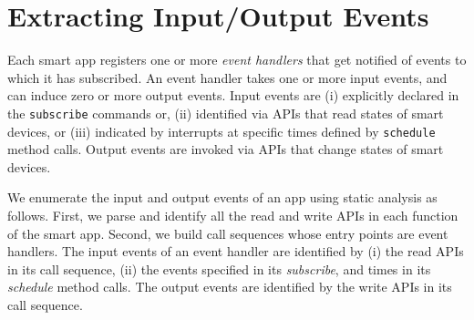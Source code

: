 \section{Extracting Input/Output Events}
{\color{black}Each smart app registers one or more {\em event handlers} that get notified of events to
which it has subscribed.
An event handler takes one or more input events, and can induce zero or more output events.
Input events are (i) explicitly declared in the \texttt{subscribe} commands or,
(ii) identified via APIs that read states of smart devices,
or (iii) indicated by interrupts at specific times defined by \texttt{schedule} method calls.
Output events are invoked via APIs that change states of smart devices.

{\color{black}We enumerate the input and output events of an app using static analysis
as follows. First, we parse and identify
all the read and write APIs in each function of the smart app. Second, we build call sequences whose entry points are event handlers. The input events of an event handler are identified by (i) the read APIs in its call sequence, (ii)
the events specified in its \textit{subscribe}, and times in its \textit{schedule} method calls.
The output events are identified by the write APIs in its call sequence.}

}
